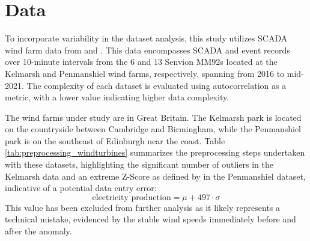 \documentclass{article}
\begin{document}
\section{Data}

To incorporate variability in the dataset analysis, this study utilizes SCADA wind farm data from \cite{Windpark_Data_1} and \cite{Windpark_Data_2}. This data encompasses SCADA and event records over 10-minute intervals from the 6 and 13 Senvion MM92s located at the Kelmarsh and Penmanshiel wind farms, respectively, spanning from 2016 to mid-2021. The complexity of each dataset is evaluated using autocorrelation as a metric, with a lower value indicating higher data complexity.

The wind farms under study are in Great Britain. The Kelmarsh park is located on the countryside between Cambridge and Birmingham, while the Penmanshiel park is on the southeast of Edinburgh near the coast. Table \ref{tab:preprocessing_windturbines} summarizes the preprocessing steps undertaken with these datasets, highlighting the significant number of outliers in the Kelmarsh data and an extreme Z-Score as defined by \cite{econometrics_intro} in the Penmanshiel dataset, indicative of a potential data entry error:
\begin{equation*}
    \text{electricity production} = \mu + 497 \cdot \sigma
\end{equation*}
This value has been excluded from further analysis as it likely represents a technical mistake, evidenced by the stable wind speeds immediately before and after the anomaly.
\end{document}
